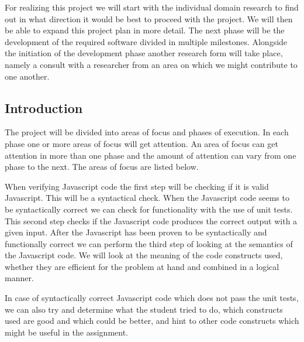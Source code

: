 \documentclass{article}
\begin{document}

For realizing this project we will start with the individual domain research to
find out in what direction it would be best to proceed with the project. We
will then be able to expand this project plan in more detail. The next phase
will be the development of the required software divided in multiple
milestones. Alongside the initiation of the development phase another research
form will take place, namely a consult with a researcher from an area on which
we might contribute to one another.

\subsection{Introduction}


The project will be divided into areas of focus and phases of execution. In
each phase one or more areas of focus will get attention. An area of focus can
get attention in more than one phase and the amount of attention can vary from
one phase to the next. The areas of focus are listed below.

When verifying Javascript code the first step will be checking if it is valid
Javascript. This will be a syntactical check. When the Javascript code seems to
be syntactically correct we can check for functionality with the use of unit
tests. This second step checks if the Javascript code produces the correct
output with a given input. After the Javascript has been proven to be
syntactically and functionally correct we can perform the third step of looking
at the semantics of the Javascript code. We will look at the meaning of the
code constructs used, whether they are efficient for the problem at hand and
combined in a logical manner.

In case of syntactically correct Javascript code which does not pass the unit
tests, we can also try and determine what the student tried to do, which
constructs used are good and which could be better, and hint to other code
constructs which might be useful in the assignment.
\end{document}
